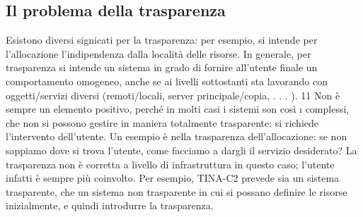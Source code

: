 \subsection{Il problema della trasparenza}
Esistono diversi signicati per la trasparenza: per esempio, si intende per l'allocazione l'indipendenza dalla località
delle risorse. In generale, per trasparenza si
intende un sistema in grado di fornire all'utente finale un comportamento omogeneo, anche se ai livelli sottostanti sta
lavorando con oggetti/servizi diversi
(remoti/locali, server principale/copia, . . . ).
11
Non è sempre un elemento positivo, perché in molti casi i sistemi son così
\i{}
complessi, che non si possono gestire in maniera totalmente trasparente: si
richiede l'intervento dell'utente. Un esempio è nella trasparenza dell'allocazione:
se non sappiamo dove si trova l'utente, come facciamo a dargli il servizio desiderato? La trasparenza non è corretta a
livello di infrastruttura in questo caso;
l'utente infatti è sempre più coinvolto.
Per esempio, TINA-C2 prevede sia un sistema trasparente, che un sistema
non trasparente in cui si possano definire le risorse inizialmente, e quindi introdurre la trasparenza.
